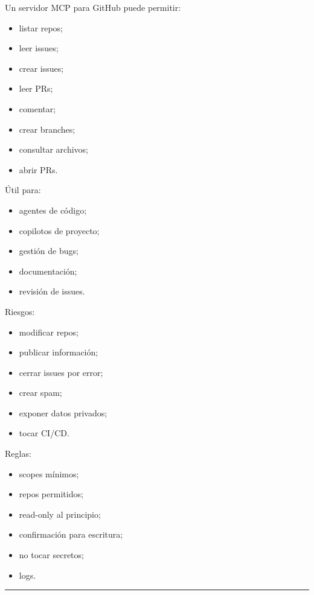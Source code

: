 Un servidor MCP para GitHub puede permitir:

\begin{itemize}
\tightlist
\item
  listar repos;
\item
  leer issues;
\item
  crear issues;
\item
  leer PRs;
\item
  comentar;
\item
  crear branches;
\item
  consultar archivos;
\item
  abrir PRs.
\end{itemize}

Útil para:

\begin{itemize}
\tightlist
\item
  agentes de código;
\item
  copilotos de proyecto;
\item
  gestión de bugs;
\item
  documentación;
\item
  revisión de issues.
\end{itemize}

Riesgos:

\begin{itemize}
\tightlist
\item
  modificar repos;
\item
  publicar información;
\item
  cerrar issues por error;
\item
  crear spam;
\item
  exponer datos privados;
\item
  tocar CI/CD.
\end{itemize}

Reglas:

\begin{itemize}
\tightlist
\item
  scopes mínimos;
\item
  repos permitidos;
\item
  read-only al principio;
\item
  confirmación para escritura;
\item
  no tocar secretos;
\item
  logs.
\end{itemize}

\begin{center}\rule{0.5\linewidth}{0.5pt}\end{center}

